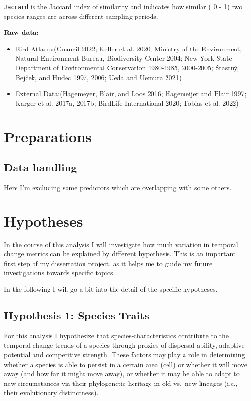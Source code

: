 \documentclass[
  letterpaper,
  DIV=11,
  numbers=noendperiod]{scrreprt}
\begin{document}
\texttt{Jaccard} is the Jaccard index of similarity and indicates how
similar ( 0 - 1) two species ranges are across different sampling
periods.

\textbf{Raw data:}

\begin{itemize}
\item
  Bird Atlases:(Council 2022; Keller et al. 2020; Ministry of the
  Environment, Natural Environment Bureau, Biodiversity Center 2004; New
  York State Department of Environmental Conservation 1980-1985,
  2000-2005; Šťastný, Bejček, and Hudec 1997, 2006; Ueda and Uemura
  2021)
\item
  External Data:(Hagemeyer, Blair, and Loos 2016; Hagemeijer and Blair
  1997; Karger et al. 2017a, 2017b; BirdLife International 2020; Tobias
  et al. 2022)
\end{itemize}


\chapter{Preparations}\label{preparations}

\section{Data handling}\label{data-handling}

Here I'm excluding some predictors which are overlapping with some
others.


\chapter{Hypotheses}\label{hypotheses}

In the course of this analysis I will investigate how much variation in
temporal change metrics can be explained by different hypothesis. This
is an important first step of my dissertation project, as it helps me to
guide my future investigations towards specific topics.

In the following I will go a bit into the detail of the specific
hypotheses.

\section{Hypothesis 1: Species Traits}

For this analysis I hypothesize that species-characteristics contribute
to the temporal change trends of a species through proxies of dispersal
ability, adaptive potential and competitive strength. These factors may
play a role in determining whether a species is able to persist in a
certain area (cell) or whether it will move away (and how far it might
move away), or whether it may be able to adapt to new circumstances via
their phylogenetic heritage in old vs.~new lineages (i.e., their
evolutionary distinctness).
\end{document}
